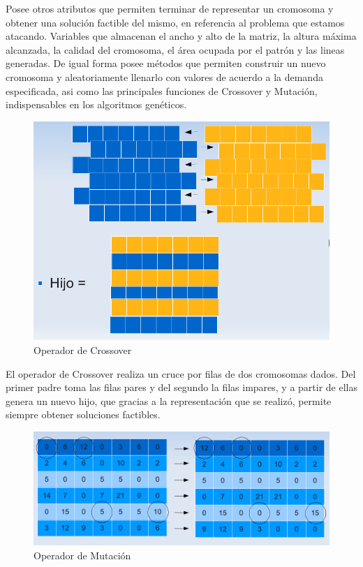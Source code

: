 \documentclass[letterpaper,11pt]{article}
\begin{document}
Posee otros atributos que permiten terminar de representar un cromosoma y obtener una soluci\'on factible del mismo, en referencia al problema que estamos atacando. Variables que almacenan el ancho y alto de la matriz, la altura m\'axima alcanzada, la calidad del cromosoma, el \'area ocupada por el patr\'on y las lineas generadas. De igual forma posee m\'etodos que permiten construir un nuevo cromosoma y aleatoriamente llenarlo con valores de acuerdo a la demanda especificada, asi como las principales funciones de Crossover y Mutaci\'on, indispensables en los algoritmos gen\'eticos.

\begin{figure}[htp]
\centering
\includegraphics[scale=0.2]{cross.png}
\caption{Operador de Crossover}
\end{figure}

El operador de Crossover realiza un cruce por filas de dos cromosomas dados. Del primer padre toma las filas pares y del segundo la filas impares, y a partir de ellas genera un nuevo hijo, que gracias a la representaci\'on que se realiz\'o, permite siempre obtener soluciones factibles.

\begin{figure}[htp]
\centering
\includegraphics[scale=0.2]{mut.png}
\caption{Operador de Mutaci\'on}
\end{figure}
\end{document}
